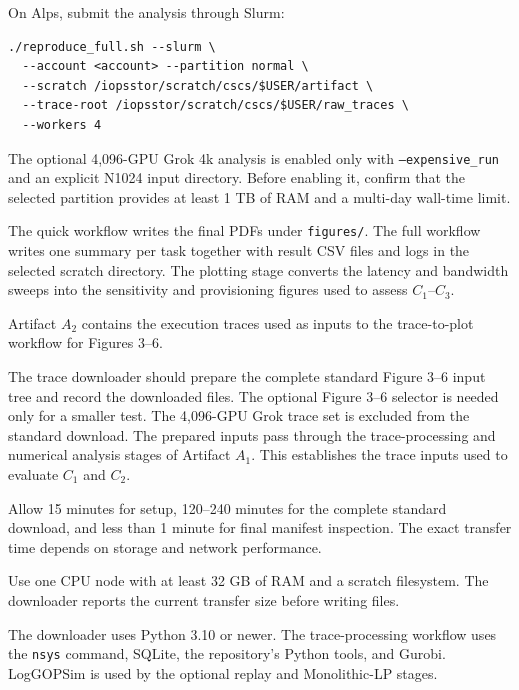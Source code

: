 \documentclass[conference]{IEEEtran}
\begin{document}
On Alps, submit the analysis through Slurm:

\begin{verbatim}
./reproduce_full.sh --slurm \
  --account <account> --partition normal \
  --scratch /iopsstor/scratch/cscs/$USER/artifact \
  --trace-root /iopsstor/scratch/cscs/$USER/raw_traces \
  --workers 4
\end{verbatim}

The optional 4,096-GPU Grok 4k analysis is enabled only with
\texttt{--expensive\_run} and an explicit N1024 input directory. Before
enabling it, confirm that the selected partition provides at least
1 TB of RAM and a multi-day wall-time limit.

\artout

The quick workflow writes the final PDFs under \texttt{figures/}. The
full workflow writes one summary per task together with result CSV files
and logs in the selected scratch directory. The plotting stage converts the
latency and bandwidth sweeps into the sensitivity and provisioning figures
used to assess $C_1$--$C_3$.

\newartifact

\artrel

Artifact $A_2$ contains the execution traces used as inputs to the
trace-to-plot workflow for Figures 3--6.

\artexp

The trace downloader should prepare the complete standard Figure 3--6 input
tree and record the downloaded files. The optional Figure 3--6 selector is
needed only for a smaller test. The 4,096-GPU Grok trace set is excluded from
the standard download. The prepared inputs pass through the trace-processing
and numerical analysis stages of Artifact $A_1$. This establishes the trace
inputs used to evaluate $C_1$ and $C_2$.

\arttime

Allow 15 minutes for setup, 120--240 minutes for the complete standard
download, and less than 1 minute for final manifest inspection. The exact
transfer time depends on storage and network performance.

\artin

\artinpart{Hardware}

Use one CPU node with at least 32 GB of RAM and a scratch filesystem. The
downloader reports the current transfer size before writing files.


The downloader uses Python 3.10 or newer. The trace-processing workflow uses
the \texttt{nsys} command, SQLite, the repository's Python tools, and Gurobi.
LogGOPSim is used by the optional replay and Monolithic-LP stages.
\end{document}
